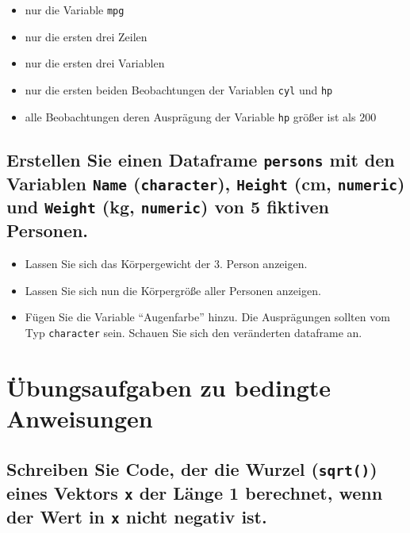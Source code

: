 \documentclass[12pt,a4paper]{article}
\begin{document}
\begin{itemize}
  \item nur die Variable \texttt{mpg}
  \item nur die ersten drei Zeilen
  \item nur die ersten drei Variablen
  \item nur die ersten beiden Beobachtungen der Variablen \texttt{cyl} und \texttt{hp}
  \item alle Beobachtungen deren Ausprägung der Variable \texttt{hp} größer ist als $200$
\end{itemize}

\hypertarget{erstellen-sie-einen-dataframe-mit-den-variablen-cm-und-kg-von-5-fiktiven-personen.}{%
\subsection{\texorpdfstring{Erstellen Sie einen Dataframe
\texttt{persons} mit den Variablen \texttt{Name} (\texttt{character}),
\texttt{Height} (cm, \texttt{numeric}) und \texttt{Weight} (kg,
\texttt{numeric}) von 5 fiktiven
Personen.}{Erstellen Sie einen Dataframe  mit den Variablen  (),  (cm, ) und  (kg, ) von 5 fiktiven Personen.}}\label{erstellen-sie-einen-dataframe-mit-den-variablen-cm-und-kg-von-5-fiktiven-personen.}}

\begin{itemize}
  \item Lassen Sie sich das Körpergewicht der 3. Person anzeigen.
  \item Lassen Sie sich nun die Körpergröße aller Personen anzeigen.
  \item Fügen Sie die Variable “Augenfarbe” hinzu. Die Ausprägungen sollten vom Typ \texttt{character} sein. Schauen Sie sich den veränderten dataframe an.
\end{itemize}

\hypertarget{uxfcbungsaufgaben-zu-bedingte-anweisungen}{%
\section{Übungsaufgaben zu bedingte
Anweisungen}\label{uxfcbungsaufgaben-zu-bedingte-anweisungen}}

\hypertarget{schreiben-sie-code-der-die-wurzel-eines-vektors-der-luxe4nge-1-berechnet-wenn-der-wert-in-nicht-negativ-ist.}{%
\subsection{\texorpdfstring{Schreiben Sie Code, der die Wurzel
(\texttt{sqrt()}) eines Vektors \texttt{x} der Länge 1 berechnet, wenn
der Wert in \texttt{x} nicht negativ
ist.}{Schreiben Sie Code, der die Wurzel () eines Vektors  der Länge 1 berechnet, wenn der Wert in  nicht negativ ist.}}\label{schreiben-sie-code-der-die-wurzel-eines-vektors-der-luxe4nge-1-berechnet-wenn-der-wert-in-nicht-negativ-ist.}}
\end{document}
